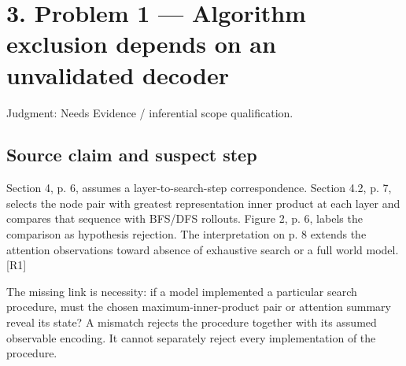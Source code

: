 \documentclass[10pt]{article}
\begin{document}
\section*{3. Problem 1 — Algorithm exclusion depends on an unvalidated decoder}
Judgment: Needs Evidence / inferential scope qualification.\par
\subsection*{Source claim and suspect step}
Section 4, p. 6, assumes a layer-to-search-step correspondence. Section 4.2, p. 7, selects the node pair with greatest representation inner product at each layer and compares that sequence with BFS/DFS rollouts. Figure 2, p. 6, labels the comparison as hypothesis rejection. The interpretation on p. 8 extends the attention observations toward absence of exhaustive search or a full world model. [R1]\par
The missing link is necessity: if a model implemented a particular search procedure, must the chosen maximum-inner-product pair or attention summary reveal its state? A mismatch rejects the procedure together with its assumed observable encoding. It cannot separately reject every implementation of the procedure.\par
\end{document}
